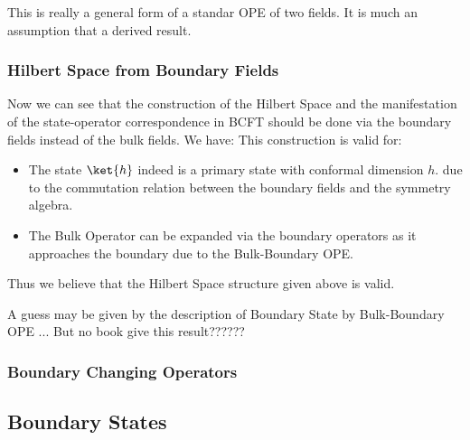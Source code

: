 This is really a general form of a standar OPE of two fields. It is much an assumption that a derived result.


\subsubsection{Hilbert Space from Boundary Fields}

Now we can see that the construction of the Hilbert Space and the manifestation of the state-operator correspondence in BCFT should be done via the boundary fields instead of the bulk fields. We have:
This construction is valid for:
\begin{itemize}
  \item The state $ \ket{h} $ indeed is a primary state with conformal dimension $ h $. due to the commutation relation between the boundary fields and the symmetry algebra. 
    \item The Bulk Operator can be expanded via the boundary operators as it approaches the boundary due to the Bulk-Boundary OPE.
\end{itemize}
Thus we believe that the Hilbert Space structure given above is valid.


A guess may be given by the description of Boundary State by Bulk-Boundary OPE ... But no book give this result??????

\subsubsection{Boundary Changing Operators}






\subsection{Boundary States}

